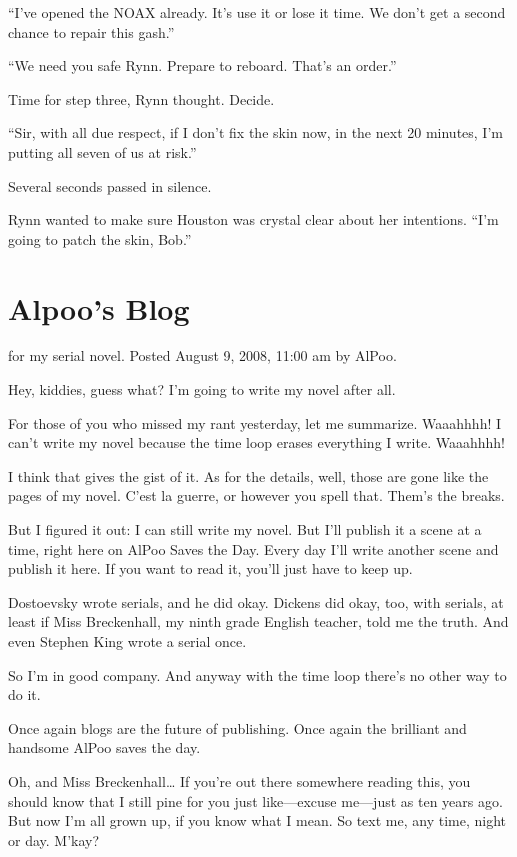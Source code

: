 “I’ve opened the NOAX already. It’s use it or lose it time. We don’t get a second chance to repair this gash.”

“We need you safe Rynn. Prepare to reboard. That’s an order.”

Time for step three, Rynn thought. Decide.

“Sir, with all due respect, if I don’t fix the skin now, in the next 20 minutes, I’m putting all seven of us at risk.”

Several seconds passed in silence.

Rynn wanted to make sure Houston was crystal clear about her intentions. “I’m going to patch the skin, Bob.”



\chapter{Alpoo’s Blog}

 for my serial novel. Posted August 9, 2008, 11:00 am by AlPoo.

Hey, kiddies, guess what? I’m going to write my novel after all.

For those of you who missed my rant yesterday, let me summarize. Waaahhhh! I can’t write my novel because the time loop erases everything I write. Waaahhhh!

I think that gives the gist of it. As for the details, well, those are gone like the pages of my novel. C’est la guerre, or however you spell that. Them’s the breaks.

But I figured it out: I can still write my novel. But I’ll publish it a scene at a time, right here on AlPoo Saves the Day. Every day I’ll write another scene and publish it here. If you want to read it, you’ll just have to keep up.

Dostoevsky wrote serials, and he did okay. Dickens did okay, too, with serials, at least if Miss Breckenhall, my ninth grade English teacher, told me the truth. And even Stephen King wrote a serial once.

So I’m in good company. And anyway with the time loop there’s no other way to do it.

Once again blogs are the future of publishing. Once again the brilliant and handsome AlPoo saves the day.

Oh, and Miss Breckenhall… If you’re out there somewhere reading this, you should know that I still pine for you just like—excuse me—just as ten years ago. But now I’m all grown up, if you know what I mean. So text me, any time, night or day. M’kay?

